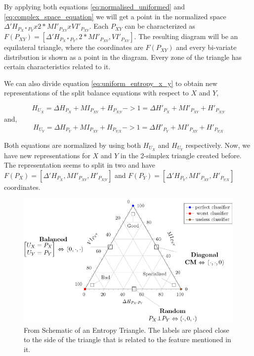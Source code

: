 By applying both equations \ref{eq:normalised_uniformed} and \ref{eq:complex_space_equation} we will get a point in the normalized space  $\Delta'H_{P_{X} * P_{Y}} x 2*MI'_{P_{XY}} x VI'_{P_{XY}}$. Each $P_{XY}$ can be characterized as $F(P_{XY}) = [\Delta'H_{P_{X} * P_{Y}},2*MI'_{P_{XY}},VI'_{P_{XY}}] $. The resulting diagram will be an equilateral triangle, where the coordinates are $F(P_{XY})$ and every bi-variate distribution is shown as a point in the diagram. Every zone of the triangle has certain characteristics related to it. \par

We can also divide equation \ref{eq:uniform_entropy_x_y} to obtain new representations of the split balance equations with respect to $X$ and $Y$,

\begin{equation}\label{eq:entropy_x_balance}
H_{U_{X}} = \Delta H_{P_{X}} + MI_{P_{XY}} + H_{P_{X|Y}}  -> 1 = \Delta H'_{P_{X}} + MI'_{P_{XY}} + H'_{P_{X|Y}}
\end{equation}
and,
\begin{equation}\label{eq:entropy_y_balance}
H_{U_{Y}} = \Delta H_{P_{Y}} + MI_{P_{XY}} + H_{P_{Y|X}}  -> 1 = \Delta H'_{P_{Y}} + MI'_{P_{XY}} + H'_{P_{Y|X}}
\end{equation}

Both equations are normalized by using both $H_{U_{X}}$ and $H_{U_{Y}}$ respectively. Now, we have new representations for $X$ and $Y$ in the 2-simplex triangle created before. The representation seems to split in two and have $F(P_X) = [\Delta'H_{P_{X}},MI'_{P_{XY}},H'_{P_{X|Y}}] $ and $F(P_Y) = [\Delta'H_{P_{Y}},MI'_{P_{XY}},H'_{P_{Y|X}}]$ coordinates.\newline

\begin{figure}[H]
 \centering
  \includegraphics[width=15cm]{Figuras_tfg/ET_Labelled.png}
  \caption{From \cite{val:pel:18c} Schematic of an Entropy Triangle. The labels are placed close to the side of the triangle that is related to the feature mentioned in it.}
 \label{fig:figure_labelled_et}
\end{figure} 

